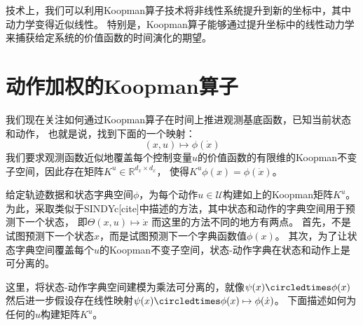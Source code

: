 \documentclass[AutoFakeBold]{LZUThesis}
\begin{document}
技术上，我们可以利用Koopman算子技术将非线性系统提升到新的坐标中，其中动力学变得近似线性。
特别是，Koopman算子能够通过提升坐标中的线性动力学来捕获给定系统的价值函数的时间演化的期望。


\section{动作加权的Koopman算子}
我们现在关注如何通过Koopman算子在时间上推进观测基底函数，已知当前状态和动作，
也就是说，找到下面的一个映射：
\begin{equation}
  (x, u) \mapsto \phi(\dot x)
\end{equation}
我们要求观测函数近似地覆盖每个控制变量$u$的价值函数的有限维的Koopman不变子空间，因此存在矩阵$K^u \in \mathbb{R}^{d_x \times d_x}$，
使得$K^u \phi(x) = \phi(\dot x)$。

给定轨迹数据和状态字典空间$\phi$，为每个动作$u \in \mathcal{U}$构建如上的Koopman矩阵$K^u$。
为此，采取类似于SINDYc[cite]中描述的方法，其中状态和动作的字典空间用于预测下一个状态，
即$\Theta(x, u) \mapsto \dot x$
而这里的方法不同的地方有两点。
首先，不是试图预测下一个状态$x$，而是试图预测下一个字典函数值$\phi(x)$。
其次，为了让状态字典空间覆盖每个$u$的Koopman不变子空间，状态-动作字典在状态和动作上是可分离的。

这里，将状态-动作字典空间建模为乘法可分离的，就像$\psi(x) \circledtimes \phi(x)$
然后进一步假设存在线性映射$\psi(x) \circledtimes \phi(x) \mapsto \phi(\dot x)$。
下面描述如何为任何的$u$构建矩阵$K^u$。
\end{document}
